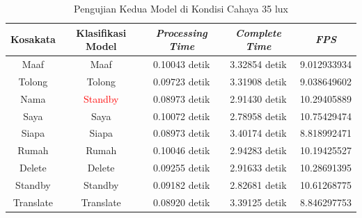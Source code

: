 \begin{longtable}{|c|c|c|c|c|}
  \caption{Pengujian Kedua Model di Kondisi Cahaya 35 lux}
  \label{tb:prediksigelap2}                                   \\
  \hline
  \rowcolor[HTML]{C0C0C0}
  \textbf{Kosakata} & \textbf{Klasifikasi Model} & \textbf{\emph{Processing Time}} & \textbf{\emph{Complete Time}} & \textbf{\emph{FPS}}\\
  \hline
  Maaf              & Maaf                            & 0.10043 detik                           & 3.32854 detik                                   & 9.012933934\\
  Tolong            & Tolong                          & 0.09723 detik                           & 3.31908 detik                                   & 9.038649602\\
  Nama              & \textcolor{red}{Standby}        & 0.08973 detik                           & 2.91430 detik                                   & 10.29405889\\
  Saya              & Saya                            & 0.10072 detik                           & 2.78958 detik                                   & 10.75429474\\
  Siapa             & Siapa                           & 0.08973 detik                           & 3.40174 detik                                   & 8.818992471\\
  Rumah             & Rumah                           & 0.10046 detik                           & 2.94283 detik                                   & 10.19425527\\
  Delete            & Delete                          & 0.09255 detik                           & 2.91633 detik                                   & 10.28691395\\
  Standby           & Standby                         & 0.09182 detik                           & 2.82681 detik                                   & 10.61268775\\
  Translate         & Translate                       & 0.08920 detik                           & 3.39125 detik                                   & 8.846297753\\
  \hline
\end{longtable}


